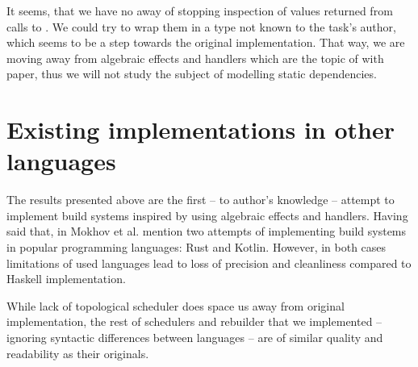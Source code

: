 It seems, that we have no away of stopping inspection of values returned from calls to . We could try to wrap them in a type not known to the task's author, which seems to be a step towards the original implementation. That way, we are moving away from algebraic effects and handlers which are the topic of with paper, thus we will not study the subject of modelling static dependencies.

\section{Existing implementations in other languages}

The results presented above are the first -- to author's knowledge -- attempt to implement build systems inspired by \BSaLC{} using algebraic effects and handlers. Having said that, in \BSaLCTP{} Mokhov et al. mention two attempts of implementing build systems in popular programming languages: Rust\cite{translation_rust} and Kotlin\cite{translation_kotlin}. However, in both cases limitations of used languages lead to loss of precision and cleanliness compared to Haskell implementation.

While lack of topological scheduler does space us away from original implementation, the rest of schedulers and rebuilder that we implemented -- ignoring syntactic differences between languages -- are of similar quality and readability as their originals.
